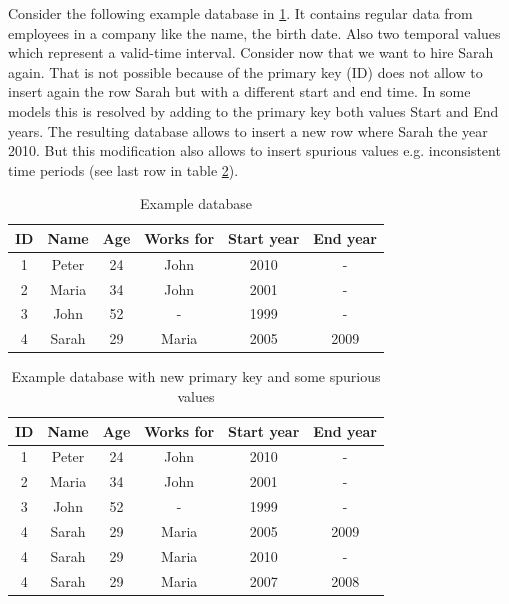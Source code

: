 \begin{example}
\label{ex:pk}
Consider the following example database in \ref{table:example-database}. It contains regular data from employees in a company like the name, the birth date. Also two temporal values which represent a valid-time interval. Consider now that we want to hire Sarah again. That is not possible because of the primary key (ID) does not allow to insert again the row Sarah but with a different start and end time. In some models this is resolved by adding to the primary key both values Start and End years. The resulting database allows to insert a new row where Sarah the year 2010. But this modification also allows to insert spurious values e.g. inconsistent time periods (see last row in table \ref{table:example-database-with-new-pk}).



\begin{table}
\centering
\caption{Example database}
\begin{tabular}{c c c c c c }
\hline
\textbf{ID} & \textbf{Name} & \textbf{Age} & \textbf{Works for} & \textbf{Start year} & \textbf{End year} \\ \hline
1 & Peter & 24 & John &  2010 & - \\
2 & Maria & 34 & John & 2001 & - \\
3 & John & 52 & - &  1999 & - \\
4 & Sarah & 29 & Maria &  2005 & 2009 \\
\hline 
\end{tabular}
\label{table:example-database}



\end{table}




\begin{table}
\centering
\caption{Example database with new primary key and some spurious values}
\begin{tabular}{c c c c c c }
\hline
\textbf{ID} & \textbf{Name} & \textbf{Age} & \textbf{Works for} & \textbf{Start year} & \textbf{End year} \\ \hline
1 & Peter & 24 & John &  2010 & - \\
2 & Maria & 34 & John & 2001 & - \\
3 & John & 52 & - &  1999 & - \\
4 & Sarah & 29 & Maria &  2005 & 2009 \\
4 & Sarah & 29 & Maria &  2010 & - \\
4 & Sarah & 29 & Maria &  2007 & 2008 \\
\hline 
\end{tabular}
\label{table:example-database-with-new-pk}


\end{table}
\end{example}
